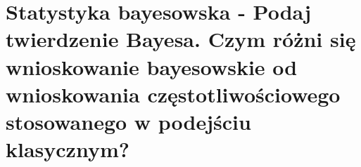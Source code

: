 \section{Statystyka bayesowska - Podaj twierdzenie Bayesa. Czym różni się wnioskowanie bayesowskie od wnioskowania częstotliwościowego stosowanego w podejściu klasycznym? }